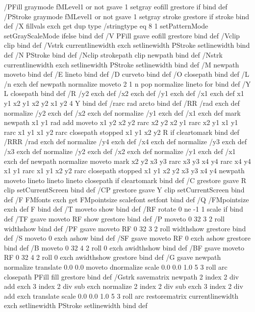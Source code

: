 /PFill {
	graymode fMLevel1 or not {
		gsave 1 setgray eofill grestore
	} if
} bind def
/PStroke {
	graymode fMLevel1 or not {
		gsave 1 setgray stroke grestore
	} if
	stroke
} bind def
/X { 
	fillvals exch get
	dup type /stringtype eq
	{8 1 setPatternMode} 
	{setGrayScaleMode}
	ifelse
	} bind def
/V { 
	PFill gsave eofill grestore
	} bind def
/Vclip {
	clip
	} bind def
/Vstrk {
	currentlinewidth exch setlinewidth PStroke setlinewidth
	} bind def
/N { 
	PStroke
	} bind def
/Nclip {
	strokepath clip newpath
	} bind def
/Nstrk {
	currentlinewidth exch setlinewidth PStroke setlinewidth
	} bind def
/M {newpath moveto} bind def
/E {lineto} bind def
/D {curveto} bind def
/O {closepath} bind def
/L { 
 	/n exch def
	newpath
	normalize
	moveto 
	2 1 n {pop normalize lineto} for
	} bind def
/Y { 
	L 
	closepath
	} bind def
/R { 
	/y2 exch def
	/x2 exch def
	/y1 exch def
	/x1 exch def
	x1 y1
	x2 y1
	x2 y2
	x1 y2
	4 Y 
	} bind def
/rarc 
	{rad 
	 arcto
	} bind def
/RR { 
	/rad exch def
	normalize
	/y2 exch def
	/x2 exch def
	normalize
	/y1 exch def
	/x1 exch def
	mark
	newpath
	{
	x1 y1 rad add moveto
	x1 y2 x2 y2 rarc
	x2 y2 x2 y1 rarc
	x2 y1 x1 y1 rarc
	x1 y1 x1 y2 rarc
	closepath
	} stopped {x1 y1 x2 y2 R} if 
	cleartomark
	} bind def
/RRR { 
	/rad exch def
	normalize /y4 exch def /x4 exch def
	normalize /y3 exch def /x3 exch def
	normalize /y2 exch def /x2 exch def
	normalize /y1 exch def /x1 exch def
	newpath
	normalize moveto 
	mark
	{
	x2 y2 x3 y3 rarc
	x3 y3 x4 y4 rarc
	x4 y4 x1 y1 rarc
	x1 y1 x2 y2 rarc
	closepath
	} stopped
	 {x1 y1 x2 y2 x3 y3 x4 y4 newpath moveto lineto lineto lineto closepath} if
	cleartomark
	} bind def
/C { 
	grestore
	gsave
	R 
	clip
	setCurrentScreen
} bind def
/CP { 
	grestore
	gsave
	Y 
	clip
	setCurrentScreen
} bind def
/F { 
	FMfonts exch get
	FMpointsize scalefont
	setfont
	} bind def
/Q { 
	/FMpointsize exch def
	F 
	} bind def
/T { 
	moveto show
	} bind def
/RF { 
	rotate
	0 ne {-1 1 scale} if
	} bind def
/TF { 
	gsave
	moveto 
	RF
	show
	grestore
	} bind def
/P { 
	moveto
	0 32 3 2 roll widthshow
	} bind def
/PF { 
	gsave
	moveto 
	RF
	0 32 3 2 roll widthshow
	grestore
	} bind def
/S { 
	moveto
	0 exch ashow
	} bind def
/SF { 
	gsave
	moveto
	RF
	0 exch ashow
	grestore
	} bind def
/B { 
	moveto
	0 32 4 2 roll 0 exch awidthshow
	} bind def
/BF { 
	gsave
	moveto
	RF
	0 32 4 2 roll 0 exch awidthshow
	grestore
	} bind def
/G { 
	gsave
	newpath
	normalize translate 0.0 0.0 moveto 
	dnormalize scale 
	0.0 0.0 1.0 5 3 roll arc 
	closepath 
	PFill fill
	grestore
	} bind def
/Gstrk {
	savematrix
    newpath
    2 index 2 div add exch 3 index 2 div sub exch 
    normalize 2 index 2 div sub exch 3 index 2 div add exch 
    translate
    scale 
    0.0 0.0 1.0 5 3 roll arc 
    restorematrix
    currentlinewidth exch setlinewidth PStroke setlinewidth
    } bind def
